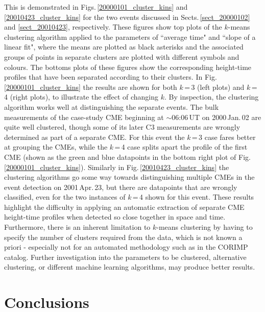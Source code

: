 \documentclass[referee,a4paper,12pt,traditabstract]{swsc}
\begin{document}
\begin{linenumbers}
This is demonstrated in Figs.\,\ref{20000101_cluster_kins} and \ref{20010423_cluster_kins} for the two events discussed in Sects.\,\ref{sect_20000102} and \ref{sect_20010423}, respectively. These figures show top plots of the $k$-means clustering algorithm applied to the parameters of ``average time" and ``slope of a linear fit", where the means are plotted as black asterisks and the associated groups of points in separate clusters are plotted with different symbols and colours. The bottoms plots of these figures show the corresponding height-time profiles that have been separated according to their clusters. In Fig.\,\ref{20000101_cluster_kins} the results are shown for both $k$\,=\,3 (left plots) and $k$\,=\,4 (right plots), to illustrate the effect of changing $k$. By inspection, the clustering algorithm works well at distinguishing the separate events. The bulk measurements of the case-study CME beginning at $\sim$06:06\,UT on 2000\,Jan.\,02 are quite well clustered, though some of its later C3 measurements are wrongly determined as part of a separate CME. For this event the $k$\,=\,3 case fares better at grouping the CMEs, while the $k$\,=\,4 case splits apart the profile of the first CME (shown as the green and blue datapoints in the bottom right plot of Fig.\,\ref{20000101_cluster_kins}). Similarly in Fig.\,\ref{20010423_cluster_kins} the clustering algorithms go some way towards distinguishing multiple CMEs in the event detection on 2001\,Apr.\,23, but there are datapoints that are wrongly classified, even for the two instances of $k$\,=\,4 shown for this event. These results highlight the difficulty in applying an automatic extraction of separate CME height-time profiles when detected so close together in space and time. Furthermore, there is an inherent limitation to $k$-means clustering by having to specify the number of clusters required from the data, which is not known a priori - especially not for an automated methodology such as in the CORIMP catalog. Further investigation into the parameters to be clustered, alternative clustering, or different machine learning algorithms, may produce better results.


\section{Conclusions}
\label{sect_conclusions}


\end{linenumbers}
\end{document}
